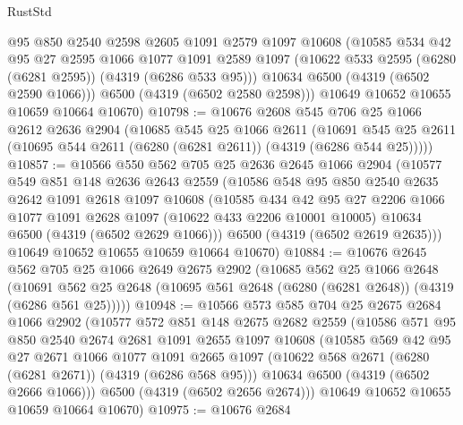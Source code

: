 \begin{lexlean}{RustStd}
\begin{coremodule}
        @95
        @850
        @2540
        @2598
        @2605
        @1091
        @2579
        @1097
        @10608
        (@10585
          @534
          @42
          @95
          @27
          @2595
          @1066
          @1077
          @1091
          @2589
          @1097
          (@10622 @533 @2595 (@6280 (@6281 @2595)) (@4319 (@6286 @533 @95)))
          @10634
          @6500
          (@4319 (@6502 @2590 @1066)))
        @6500
        (@4319 (@6502 @2580 @2598)))
      @10649
      @10652
      @10655
      @10659
      @10664
      @10670)
@10798 := @10676
    @2608
    @545
    @706
    @25
    @1066
    @2612
    @2636
    @2904
    (@10685
      @545
      @25
      @1066
      @2611
      (@10691 @545 @25 @2611 (@10695 @544 @2611 (@6280 (@6281 @2611)) (@4319 (@6286 @544 @25)))))
@10857 := @10566
    @550
    @562
    @705
    @25
    @2636
    @2645
    @1066
    @2904
    (@10577
      @549
      @851
      @148
      @2636
      @2643
      @2559
      (@10586
        @548
        @95
        @850
        @2540
        @2635
        @2642
        @1091
        @2618
        @1097
        @10608
        (@10585
          @434
          @42
          @95
          @27
          @2206
          @1066
          @1077
          @1091
          @2628
          @1097
          (@10622 @433 @2206 @10001 @10005)
          @10634
          @6500
          (@4319 (@6502 @2629 @1066)))
        @6500
        (@4319 (@6502 @2619 @2635)))
      @10649
      @10652
      @10655
      @10659
      @10664
      @10670)
@10884 := @10676
    @2645
    @562
    @705
    @25
    @1066
    @2649
    @2675
    @2902
    (@10685
      @562
      @25
      @1066
      @2648
      (@10691 @562 @25 @2648 (@10695 @561 @2648 (@6280 (@6281 @2648)) (@4319 (@6286 @561 @25)))))
@10948 := @10566
    @573
    @585
    @704
    @25
    @2675
    @2684
    @1066
    @2902
    (@10577
      @572
      @851
      @148
      @2675
      @2682
      @2559
      (@10586
        @571
        @95
        @850
        @2540
        @2674
        @2681
        @1091
        @2655
        @1097
        @10608
        (@10585
          @569
          @42
          @95
          @27
          @2671
          @1066
          @1077
          @1091
          @2665
          @1097
          (@10622 @568 @2671 (@6280 (@6281 @2671)) (@4319 (@6286 @568 @95)))
          @10634
          @6500
          (@4319 (@6502 @2666 @1066)))
        @6500
        (@4319 (@6502 @2656 @2674)))
      @10649
      @10652
      @10655
      @10659
      @10664
      @10670)
@10975 := @10676
    @2684

\end{coremodule}
\end{lexlean}
